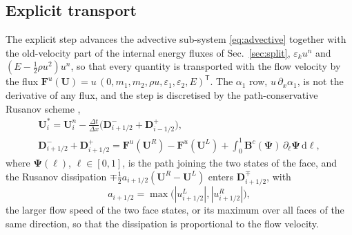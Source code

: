 \documentclass[a4paper,fleqn]{cas-sc}
\begin{document}
\subsection{Explicit transport}
\label{sec:advective}
The explicit step advances the advective sub-system \eqref{eq:advective} together with the old-velocity part of the internal
energy fluxes of Sec.~\ref{sec:split}, $\varepsilon_ku^n$ and $(E-\tfrac12\rho u^2)u^n$, so that every quantity is transported with the flow velocity
by the flux $\mathbf F^u(\mathbf U)=u\,(0,m_1,m_2,\rho u,\varepsilon_1,\varepsilon_2,E)^{\mathsf T}$. The $\alpha_1$ row, $u\,\partial_x\alpha_1$, is not the derivative of
any flux, and the step is discretised by the path-conservative Rusanov scheme
\cite{DalMaso1995,Pares2006,Castro2006},
\begin{equation}
\begin{gathered}
\mathbf U^*_i=\mathbf U^n_i-\frac{\Delta t}{\Delta x}\Big(\mathbf D^-_{i+1/2}+\mathbf D^+_{i-1/2}\Big),\\
\mathbf D^-_{i+1/2}+\mathbf D^+_{i+1/2}=\mathbf F^u(\mathbf U^R)-\mathbf F^u(\mathbf U^L)+\int_0^1\mathbf B^c(\boldsymbol\Psi)\,\partial_\ell\boldsymbol\Psi\,\mathrm d\ell ,
\end{gathered}
\label{eq:pc_update}
\end{equation}
where $\boldsymbol\Psi(\ell)$, $\ell\in[0,1]$, is the path joining the two states of the face, and the Rusanov dissipation
$\mp\tfrac12a_{i+1/2}(\mathbf U^R-\mathbf U^L)$ enters $\mathbf D^\mp_{i+1/2}$, with
\begin{equation}
a_{i+1/2}=\max\big(|u^L_{i+1/2}|,|u^R_{i+1/2}|\big),
\label{eq:rusanov_speed}
\end{equation}
the larger flow speed of the two face states, or its maximum over all faces of the same
direction, so that the dissipation is proportional to the flow velocity.
\end{document}
